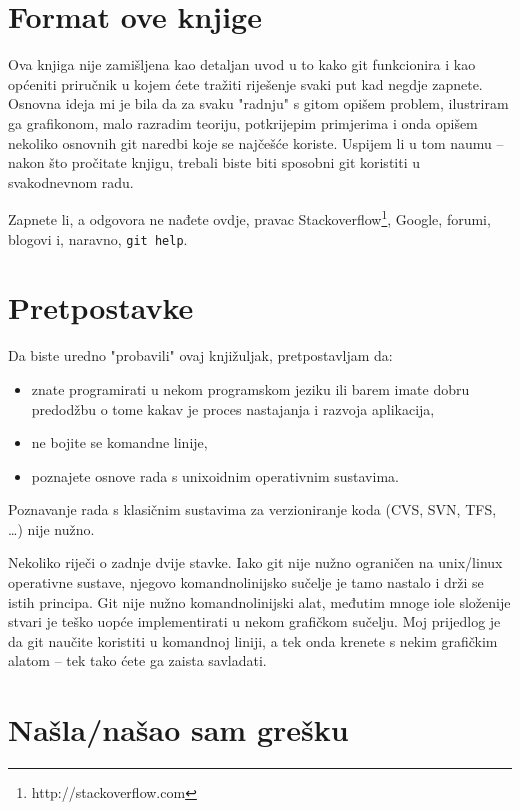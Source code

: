 \section*{Format ove knjige}

Ova knjiga nije zamišljena kao detaljan uvod u to kako git funkcionira i kao općeniti priručnik u kojem ćete tražiti riješenje svaki put kad negdje zapnete.
Osnovna ideja mi je bila da za svaku "radnju" s gitom opišem problem, ilustriram ga grafikonom, malo razradim teoriju, potkrijepim primjerima i onda opišem nekoliko osnovnih git naredbi koje se najčešće koriste.
Uspijem li u tom naumu -- nakon što pročitate knjigu, trebali biste biti sposobni git koristiti u svakodnevnom radu. 

Zapnete li, a odgovora ne nađete ovdje, pravac Stackoverflow\footnote{http://stackoverflow.com}, Google, 
forumi, blogovi i, naravno, \verb+git help+.

\section*{Pretpostavke}

Da biste uredno "probavili" ovaj knjižuljak, pretpostavljam da:

\begin{itemize}
	\item znate programirati u nekom programskom jeziku ili barem imate dobru predodžbu o tome kakav je proces nastajanja i razvoja aplikacija,
	\item ne bojite se komandne linije,
	\item poznajete osnove rada s unixoidnim operativnim sustavima.
\end{itemize}

Poznavanje rada s klasičnim sustavima za verzioniranje koda (CVS, SVN, TFS, \dots) nije nužno.

Nekoliko riječi o zadnje dvije stavke.
Iako git nije nužno ograničen na unix/linux operativne sustave, njegovo komandnolinijsko sučelje je tamo nastalo i drži se istih principa.
Git nije nužno komandnolinijski alat, međutim mnoge iole složenije stvari je teško uopće implementirati u nekom grafičkom sučelju. 
Moj prijedlog je da git naučite koristiti u komandnoj liniji, a tek onda krenete s nekim grafičkim alatom -- tek tako ćete ga zaista savladati.

\section*{Našla/našao sam grešku}


